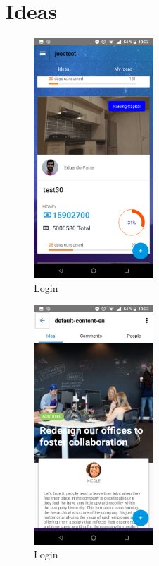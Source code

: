 \section{Ideas}

\begin{figure}[!h]
	\begin{center}
		\includegraphics[width=0.4\textwidth]{./img/anexo1/inicio_mis_ideas.png}
		\caption{Login}
		\label{fig:inicio_mis_ideas}
	\end{center}
\end{figure}

\begin{figure}[!h]
	\begin{center}
		\includegraphics[width=0.4\textwidth]{./img/anexo1/ver_idea_inicio.png}
		\caption{Login}
		\label{fig:ver_idea_inicio}
	\end{center}
\end{figure}


